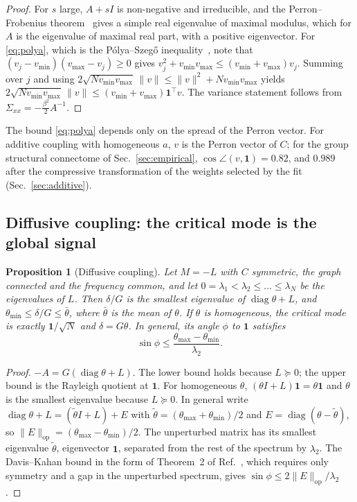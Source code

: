 \documentclass[aip,cha,reprint,amsmath,amssymb]{revtex4-2}
\newtheorem{proposition}{Proposition}
\theoremstyle{remark}
\newcommand{\one}{\mathbf 1}
\newcommand{\diag}{\operatorname{diag}}
\begin{document}
\begin{proof}
For $s$ large, $A+sI$ is non-negative and irreducible, and the Perron--Frobenius theorem~\cite{Berman1994} gives a simple real eigenvalue of maximal modulus, which for $A$ is the eigenvalue of maximal real part, with a positive eigenvector. For \eqref{eq:polya}, which is the Pólya--Szegő inequality~\cite{PolyaSzego1925}, note that $(v_j-v_{\min})(v_{\max}-v_j)\ge0$ gives $v_j^2+v_{\min}v_{\max}\le(v_{\min}+v_{\max})v_j$. Summing over $j$ and using $2\sqrt{N v_{\min}v_{\max}}\,\|v\|\le\|v\|^2+Nv_{\min}v_{\max}$ yields $2\sqrt{Nv_{\min}v_{\max}}\,\|v\|\le(v_{\min}+v_{\max})\one^\top v$. The variance statement follows from $\Sigma_{xx}=-\tfrac{\beta^2}2A^{-1}$.
\end{proof}

The bound \eqref{eq:polya} depends only on the spread of the Perron vector. For additive coupling with homogeneous $a$, $v$ is the Perron vector of $C$; for the group structural connectome of Sec.~\ref{sec:empirical}, $\cos\angle(v,\one)=0.82$, and $0.989$ after the compressive transformation of the weights selected by the fit (Sec.~\ref{sec:additive}).

\subsection{Diffusive coupling: the critical mode is the global signal}

\begin{proposition}[Diffusive coupling]\label{prop:diffusive}
Let $M=-L$ with $C$ symmetric, the graph connected and the frequency common, and let $0=\lambda_1<\lambda_2\le\dots\le\lambda_N$ be the eigenvalues of $L$. Then $\delta/G$ is the smallest eigenvalue of $\diag\theta+L$, and $\theta_{\min}\le\delta/G\le\bar\theta$, where $\bar\theta$ is the mean of $\theta$. If $\theta$ is homogeneous, the critical mode is exactly $\one/\sqrt N$ and $\delta=G\theta$. In general, its angle $\phi$ to $\one$ satisfies
\begin{equation}\label{eq:dk}
  \sin\phi\le\frac{\theta_{\max}-\theta_{\min}}{\lambda_2}.
\end{equation}
\end{proposition}

\begin{proof}
$-A=G(\diag\theta+L)$. The lower bound holds because $L\succeq0$; the upper bound is the Rayleigh quotient at $\one$. For homogeneous $\theta$, $(\theta I+L)\one=\theta\one$ and $\theta$ is the smallest eigenvalue because $L\succeq0$. In general write $\diag\theta+L=(\tilde\theta I+L)+E$ with $\tilde\theta=(\theta_{\max}+\theta_{\min})/2$ and $E=\diag(\theta-\tilde\theta)$, so $\|E\|_{\mathrm{op}}=(\theta_{\max}-\theta_{\min})/2$. The unperturbed matrix has its smallest eigenvalue $\tilde\theta$, eigenvector $\one$, separated from the rest of the spectrum by $\lambda_2$. The Davis--Kahan bound in the form of Theorem~2 of Ref.~, which requires only symmetry and a gap in the unperturbed spectrum, gives $\sin\phi\le2\|E\|_{\mathrm{op}}/\lambda_2$.
\end{proof}
\end{document}
